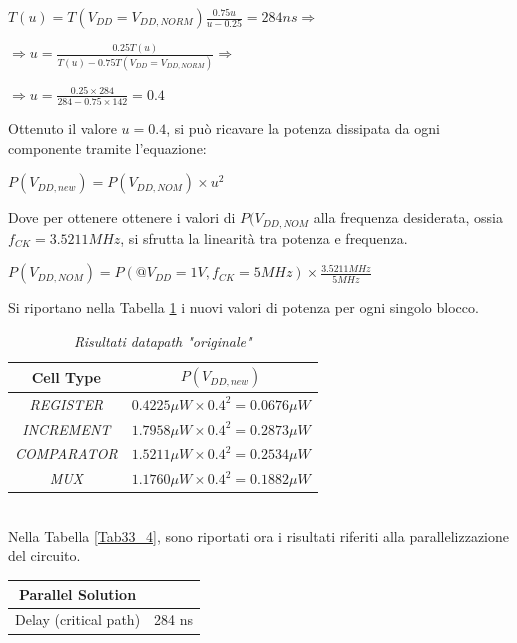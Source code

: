 {\begin{center}
	$T(u)=T(V_{DD}=V_{DD, NORM})\frac{0.75u}{u-0.25}=284 ns \Longrightarrow$
\end{center}
\begin{center}
		$\Longrightarrow u=\frac{0.25T(u)}{T(u)-0.75T(V_{DD}=V_{DD,NORM})}\Longrightarrow$
\end{center}
\begin{center}
	$\Longrightarrow u=\frac{0.25\times 284}{284-0.75 \times 142}=0.4$
\end{center}
Ottenuto il valore $u=0.4$, si può ricavare la potenza dissipata da ogni componente tramite l'equazione:
\begin{center}
   $P(V_{DD,new})=P(V_{DD, NOM})\times u^{2}$
\end{center}
Dove per ottenere ottenere i valori di $P(V_{DD, NOM}$ alla frequenza desiderata, ossia $f_{CK}=3.5211 MHz$, si sfrutta la linearità tra potenza e frequenza.
\begin{center}
	$P(V_{DD, NOM})=P(@V_ {DD}=1 V, f_{CK}=5MHz)\times \frac{3.5211 MHz}{5MHz}$
\end{center}
Si riportano nella Tabella \ref{Tab33_3} i nuovi valori di potenza per ogni singolo blocco.\\
\begin{table}[!h]\footnotesize
	\centering
	\begin{tabular}{|c|c|}
		\hline
		\textbf{Cell Type} & \textbf{$P(V_{DD, new})$} \\
		\hline
		\textit{REGISTER} & $0.4225 \mu W \times 0.4^{2}=0.0676 \mu W$\\
		\textit{INCREMENT} & $1.7958 \mu W \times 0.4^{2}=0.2873 \mu W$\\
		\textit{COMPARATOR} & $1.5211 \mu W \times 0.4^{2}=0.2534 \mu W$\\
		\textit{MUX} &$1.1760 \mu W \times 0.4^{2}=0.1882 \mu W$\\
		\hline
	\end{tabular}
	\caption{\textit{Risultati datapath "originale"}}
	\label{Tab33_3}
\end{table}
\\
Nella Tabella \ref{Tab33_4}, sono riportati ora i risultati riferiti alla parallelizzazione del circuito.
\begin{table}[!h]\footnotesize
	\centering
	\begin{tabular}{|c|c|}
		\hline
		\textbf{Parallel Solution} & \\
		\hline
		Delay (critical path) & 284 ns\\

\end{tabular}
\end{table}}

